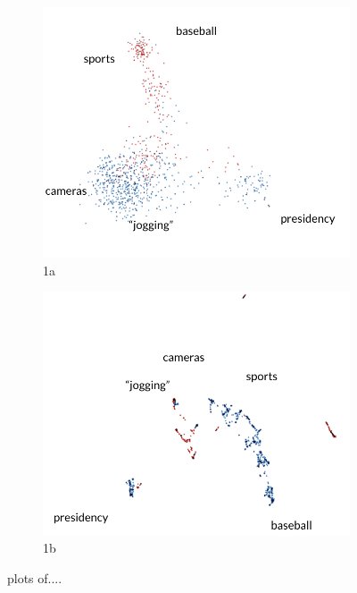 \documentclass[a4paper,12pt,twoside,openright]{report}
\begin{document}
\begin{figure}
\begin{subfigure}{.5\textwidth}
  \centering
  \includegraphics[width=.8\linewidth]{./assets/analysis/run_pca.png}
  \caption{1a}
  \label{fig:sfig1}
\end{subfigure}%
\begin{subfigure}{.5\textwidth}
  \centering
  \includegraphics[width=.8\linewidth]{./assets/analysis/run_umap.png}
  \caption{1b}
  \label{fig:sfig2}
\end{subfigure}
\caption{plots of....}
\label{fig:fig}
\end{figure}
\end{document}
